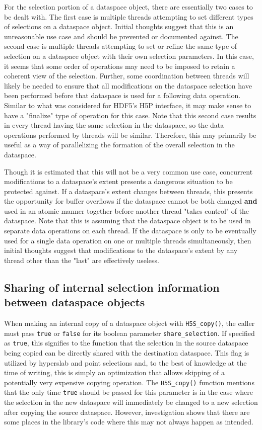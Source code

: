 \documentclass[../HDF5_RFC.tex]{subfiles}
\begin{document}
For the selection portion of a dataspace object, there are essentially two cases to be dealt
with. The first case is multiple threads attempting to set different types of selections on
a dataspace object. Initial thoughts suggest that this is an unreasonable use case and should
be prevented or documented against. The second case is multiple threads attempting to set or
refine the same type of selection on a dataspace object with their own selection parameters.
In this case, it seems that some order of operations may need to be imposed to retain a
coherent view of the selection. Further, some coordination between threads will likely be
needed to ensure that all modifications on the dataspace selection have been performed before
that dataspace is used for a following data operation. Similar to what was considered for
HDF5's H5P interface, it may make sense to have a "finalize" type of operation for this case.
Note that this second case results in every thread having the same selection in the dataspace,
so the data operations performed by threads will be similar. Therefore, this may primarily be
useful as a way of parallelizing the formation of the overall selection in the dataspace.

Though it is estimated that this will not be a very common use case, concurrent modifications
to a dataspace's extent presents a dangerous situation to be protected against. If a dataspace's
extent changes between threads, this presents the opportunity for buffer overflows if the
dataspace cannot be both changed \textbf{and} used in an atomic manner together before another
thread "takes control" of the dataspace. Note that this is assuming that the dataspace object
is to be used in separate data operations on each thread. If the dataspace is only to be
eventually used for a single data operation on one or multiple threads simultaneously, then
initial thoughts suggest that modifications to the dataspace's extent by any thread other than
the "last" are effectively useless.

\subsection{Sharing of internal selection information between dataspace objects}
\label{h5s_state_sharing}

When making an internal copy of a dataspace object with \texttt{H5S\_copy()}, the caller
must pass \texttt{true} or \texttt{false} for its boolean parameter \texttt{share\_selection}.
If specified as \texttt{true}, this signifies to the function that the selection in the
source dataspace being copied can be directly shared with the destination dataspace. This
flag is utilized by hyperslab and point selections and, to the best of knowledge at the time of
writing, this is simply an optimization that allows skipping of a potentially very expensive
copying operation. The \texttt{H5S\_copy()} function mentions that the only time \texttt{true}
should be passed for this parameter is in the case where the selection in the new dataspace
will immediately be changed to a new selection after copying the source dataspace. However,
investigation shows that there are some places in the library's code where this may not always
happen as intended.
\end{document}
